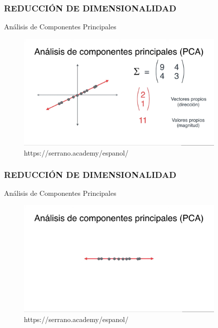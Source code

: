 \documentclass{beamer}
\begin{document}
\begin{frame}
	\frametitle{REDUCCIÓN DE DIMENSIONALIDAD}
	\begin{block}{Análisis de Componentes Principales}	
		\begin{figure}
			\includegraphics[width=0.9\textwidth]{PCA/IMG_3587.jpg}
			\caption{https://serrano.academy/espanol/}
		\end{figure}
	\end{block}
\end{frame}

\begin{frame}
	\frametitle{REDUCCIÓN DE DIMENSIONALIDAD}
	\begin{block}{Análisis de Componentes Principales}	
		\begin{figure}
			\includegraphics[width=0.9\textwidth]{PCA/IMG_3588.jpg}
			\caption{https://serrano.academy/espanol/}
		\end{figure}
	\end{block}
\end{frame}
\end{document}
